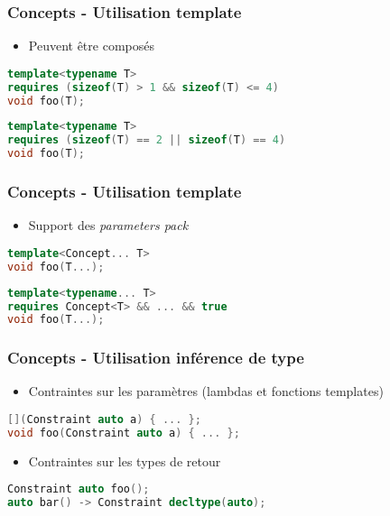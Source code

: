 \documentclass[C++.tex]{subfiles}
\begin{document}
\begin{frame}[fragile]
	\frametitle{Concepts - Utilisation template}
	\begin{itemize}
		\item Peuvent être composés
	\end{itemize}

	\begin{lstlisting}[language=C++]
template<typename T>
requires (sizeof(T) > 1 && sizeof(T) <= 4)
void foo(T);\end{lstlisting}

	\begin{lstlisting}[language=C++]
template<typename T>
requires (sizeof(T) == 2 || sizeof(T) == 4)
void foo(T);\end{lstlisting}
\end{frame}

\begin{frame}[fragile]
	\frametitle{Concepts - Utilisation template}
	\begin{itemize}
		\item Support des \textit{parameters pack}
	\end{itemize}

	\begin{lstlisting}[language=C++]
template<Concept... T>
void foo(T...);\end{lstlisting}

	\begin{lstlisting}[language=C++]
template<typename... T>
requires Concept<T> && ... && true
void foo(T...);\end{lstlisting}
\end{frame}

\begin{frame}[fragile]
	\frametitle{Concepts - Utilisation inférence de type}
	\begin{itemize}
		\item Contraintes sur les paramètres (lambdas et fonctions templates)
	\end{itemize}

	\begin{lstlisting}[language=C++]
[](Constraint auto a) { ... };
void foo(Constraint auto a) { ... };\end{lstlisting}

	\begin{itemize}
		\item Contraintes sur les types de retour
	\end{itemize}

	\begin{lstlisting}[language=C++]
Constraint auto foo();
auto bar() -> Constraint decltype(auto);\end{lstlisting}
\end{frame}
\end{document}
